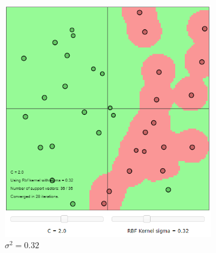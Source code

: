 \documentclass{article}
\begin{document}
        \begin{figure}[h]
             \centering
             \begin{subfigure}[b]{0.3\textwidth}
                 \centering
                 \includegraphics[width=\textwidth]{Assignment 1/figures/RBF_low_sigma.png}
                 \caption{$\sigma^2 = 0.32$}
                 \label{fig:low_sigma}
             \end{subfigure}
             \hfill
             \begin{subfigure}[b]{0.3\textwidth}
                 \centering

\end{subfigure}
\end{figure}
\end{document}
